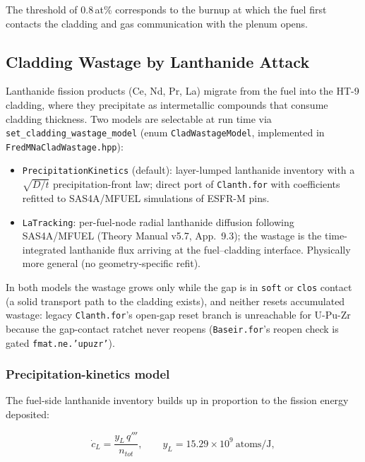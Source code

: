 \begin{refsection}
The threshold of 0.8\,at\% corresponds to the burnup at which the fuel first contacts the cladding and gas communication with the plenum opens.

\subsection{Cladding Wastage by Lanthanide Attack}
\label{sec:wastage}

Lanthanide fission products (Ce, Nd, Pr, La) migrate from the fuel into the
HT-9 cladding, where they precipitate as intermetallic compounds that
consume cladding thickness.  Two models are selectable at run time via
\texttt{set\_cladding\_wastage\_model} (enum \texttt{CladWastageModel},
implemented in \texttt{FredMNaCladWastage.hpp}):

\begin{itemize}
\item \texttt{PrecipitationKinetics} (default): layer-lumped lanthanide
      inventory with a $\sqrt{D/t}$ precipitation-front law; direct port of
      \texttt{Clanth.for} \cite{timpanoFredM} with coefficients refitted to
      SAS4A/MFUEL simulations of ESFR-M pins.
\item \texttt{LaTracking}: per-fuel-node radial lanthanide diffusion
      following SAS4A/MFUEL (Theory Manual v5.7, App.~9.3); the wastage is
      the time-integrated lanthanide flux arriving at the fuel--cladding
      interface.  Physically more general (no geometry-specific refit).
\end{itemize}

In both models the wastage grows only while the gap is in \texttt{soft} or
\texttt{clos} contact (a solid transport path to the cladding exists), and
neither resets accumulated wastage: legacy \texttt{Clanth.for}'s
open-gap reset branch is unreachable for U-Pu-Zr because the gap-contact
ratchet never reopens (\texttt{Baseir.for}'s reopen check is gated
\texttt{fmat.ne.'upuzr'}).

\subsubsection{Precipitation-kinetics model}

The fuel-side lanthanide inventory builds up in proportion to the fission
energy deposited:

\begin{equation}
  \dot c_L = \frac{y_L\, q'''}{n_{tot}},
  \qquad y_L = 15.29\times10^{9}\ \mathrm{atoms/J},
  \label{eq:wastage_source}
\end{equation}


\end{refsection}
